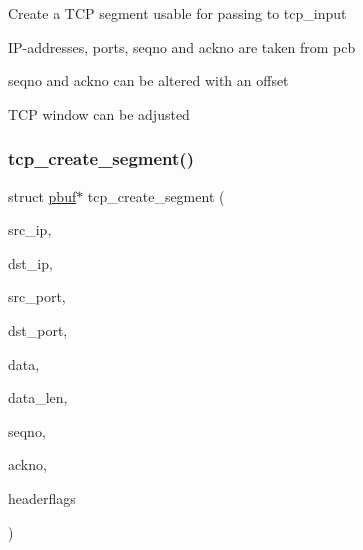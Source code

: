 Create a T\+CP segment usable for passing to tcp\+\_\+input
\begin{DoxyItemize}
\item I\+P-\/addresses, ports, seqno and ackno are taken from pcb
\item seqno and ackno can be altered with an offset
\item T\+CP window can be adjusted 
\end{DoxyItemize}\mbox{\label{openmote-cc2538_2lwip_2test_2unit_2tcp_2tcp__helper_8c_aa6f4b7b087e8641f6c178d8752cc4fab}} 
\subsubsection{\texorpdfstring{tcp\+\_\+create\+\_\+segment()}{tcp\_create\_segment()}}
{\footnotesize\ttfamily struct \hyperlink{structpbuf}{pbuf}$\ast$ tcp\+\_\+create\+\_\+segment (\begin{DoxyParamCaption}\item[{\hyperlink{native_2lwip_2src_2include_2lwip_2ip__addr_8h_a88b43639738c4de2d3cd22e3a1fd7696}{ip\+\_\+addr\+\_\+t} $\ast$}]{src\+\_\+ip,  }\item[{\hyperlink{native_2lwip_2src_2include_2lwip_2ip__addr_8h_a88b43639738c4de2d3cd22e3a1fd7696}{ip\+\_\+addr\+\_\+t} $\ast$}]{dst\+\_\+ip,  }\item[{\hyperlink{group__compiler__abstraction_ga77570ac4fcab86864fa1916e55676da2}{u16\+\_\+t}}]{src\+\_\+port,  }\item[{\hyperlink{group__compiler__abstraction_ga77570ac4fcab86864fa1916e55676da2}{u16\+\_\+t}}]{dst\+\_\+port,  }\item[{void $\ast$}]{data,  }\item[{size\+\_\+t}]{data\+\_\+len,  }\item[{\hyperlink{group__compiler__abstraction_ga4c14294869aceba3ef9d4c0c302d0f33}{u32\+\_\+t}}]{seqno,  }\item[{\hyperlink{group__compiler__abstraction_ga4c14294869aceba3ef9d4c0c302d0f33}{u32\+\_\+t}}]{ackno,  }\item[{\hyperlink{group__compiler__abstraction_ga4caecabca98b43919dd11be1c0d4cd8e}{u8\+\_\+t}}]{headerflags }\end{DoxyParamCaption})}

